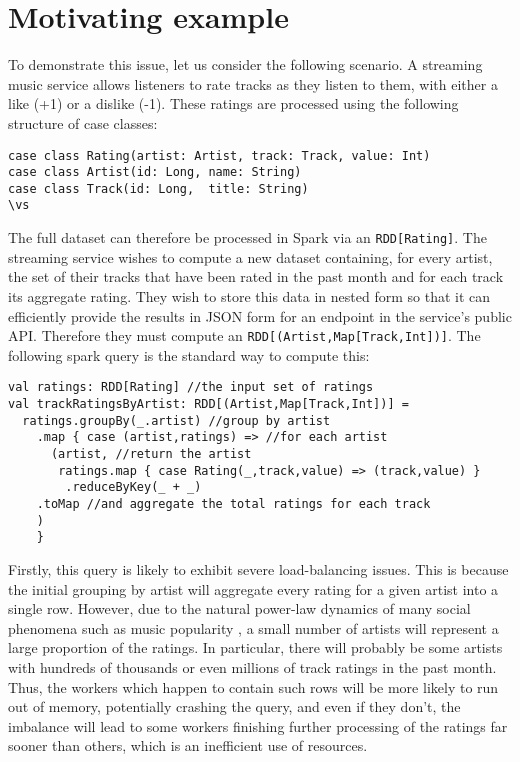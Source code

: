 \section{Motivating example} {

To demonstrate this issue, let us consider the following scenario. A streaming music service allows listeners to rate tracks as they listen to them, with either a like (+1) or a dislike (-1). These ratings are processed using the following structure of case classes:
\vs\begin{lstlisting}
case class Rating(artist: Artist, track: Track, value: Int)
case class Artist(id: Long, name: String)
case class Track(id: Long,  title: String)
\vs\end{lstlisting}
The full dataset can therefore be processed in Spark via an \lstinline{RDD[Rating]}. The streaming service wishes to compute a new dataset containing, for every artist, the set of their tracks that have been rated in the past month and for each track its aggregate rating. They wish to store this data in nested form so that it can efficiently provide the results in JSON form for an endpoint in the service's public API. Therefore they must compute an \lstinline{RDD[(Artist,Map[Track,Int])]}. The following spark query is the standard way to compute this:
\vs\begin{lstlisting}
val ratings: RDD[Rating] //the input set of ratings
val trackRatingsByArtist: RDD[(Artist,Map[Track,Int])] =
  ratings.groupBy(_.artist) //group by artist
    .map { case (artist,ratings) => //for each artist
      (artist, //return the artist
       ratings.map { case Rating(_,track,value) => (track,value) } 
        .reduceByKey(_ + _)
	.toMap //and aggregate the total ratings for each track
	)
    }
\end{lstlisting}\vs
Firstly, this query is likely to exhibit severe load-balancing issues. This is because the initial grouping by artist will aggregate every rating for a given artist into a single row. However, due to the natural power-law dynamics of many social phenomena such as music popularity \cite{musicpowerlaw}, a small number of artists will represent a large proportion of the ratings. In particular, there will probably be some artists with hundreds of thousands or even millions of track ratings in the past month. Thus, the workers which happen to contain such rows will be more likely to run out of memory, potentially crashing the query, and even if they don't, the imbalance will lead to some workers finishing further processing of the ratings far sooner than others, which is an inefficient use of resources.

}
